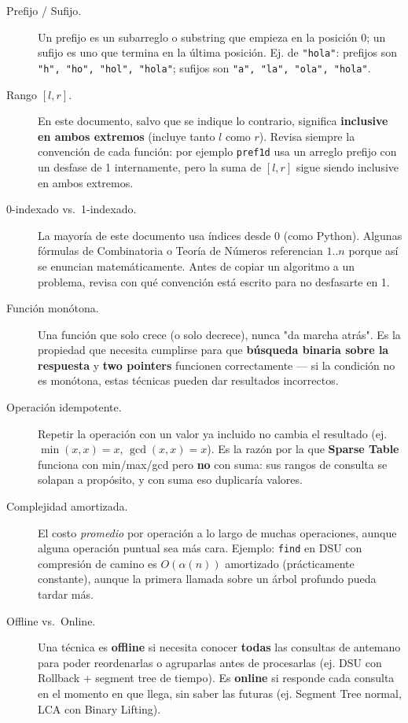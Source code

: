 \begin{description}
  \item[Prefijo / Sufijo.] Un prefijo es un subarreglo o substring que empieza en la posición 0; un sufijo es uno que termina en la última posición. Ej. de \texttt{"hola"}: prefijos son \texttt{"h", "ho", "hol", "hola"}; sufijos son \texttt{"a", "la", "ola", "hola"}.

  \item[{Rango \([l, r]\).}] En este documento, salvo que se indique lo contrario, significa \textbf{inclusive en ambos extremos} (incluye tanto \(l\) como \(r\)). Revisa siempre la convención de cada función: por ejemplo \texttt{pref1d} usa un arreglo prefijo con un desfase de 1 internamente, pero la suma de \([l,r]\) sigue siendo inclusive en ambos extremos.

  \item[0-indexado vs.\ 1-indexado.] La mayoría de este documento usa índices desde 0 (como Python). Algunas fórmulas de Combinatoria o Teoría de Números referencian \(1..n\) porque así se enuncian matemáticamente. Antes de copiar un algoritmo a un problema, revisa con qué convención está escrito para no desfasarte en 1.

  \item[Función monótona.] Una función que solo crece (o solo decrece), nunca "da marcha atrás". Es la propiedad que necesita cumplirse para que \textbf{búsqueda binaria sobre la respuesta} y \textbf{two pointers} funcionen correctamente — si la condición no es monótona, estas técnicas pueden dar resultados incorrectos.

  \item[Operación idempotente.] Repetir la operación con un valor ya incluido no cambia el resultado (ej. \(\min(x,x)=x\), \(\gcd(x,x)=x\)). Es la razón por la que \textbf{Sparse Table} funciona con min/max/gcd pero \textbf{no} con suma: sus rangos de consulta se solapan a propósito, y con suma eso duplicaría valores.

  \item[Complejidad amortizada.] El costo \textit{promedio} por operación a lo largo de muchas operaciones, aunque alguna operación puntual sea más cara. Ejemplo: \texttt{find} en DSU con compresión de camino es \(O(\alpha(n))\) amortizado (prácticamente constante), aunque la primera llamada sobre un árbol profundo pueda tardar más.

  \item[Offline vs.\ Online.] Una técnica es \textbf{offline} si necesita conocer \textbf{todas} las consultas de antemano para poder reordenarlas o agruparlas antes de procesarlas (ej. DSU con Rollback + segment tree de tiempo). Es \textbf{online} si responde cada consulta en el momento en que llega, sin saber las futuras (ej. Segment Tree normal, LCA con Binary Lifting).


\end{description}
